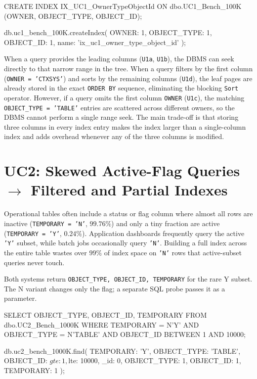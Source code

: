\begin{SQLCode}
CREATE INDEX IX_UC1_OwnerTypeObjectId
ON dbo.UC1_Bench_100K (OWNER, OBJECT_TYPE, OBJECT_ID);
\end{SQLCode}
\begin{MongoCode}
db.uc1_bench_100K.createIndex(
  {OWNER: 1, OBJECT_TYPE: 1, OBJECT_ID: 1},
  {name: 'ix_uc1_owner_type_object_id'}
);
\end{MongoCode}

When a query provides the leading columns (\texttt{U1a}, \texttt{U1b}), the DBMS can seek directly to that narrow range in the tree. When a query filters by the first column (\texttt{OWNER = 'CTXSYS'}) and sorts by the remaining columns (\texttt{U1d}), the leaf pages are already stored in the exact \texttt{ORDER BY} sequence, eliminating the blocking \texttt{Sort} operator. However, if a query omits the first column \texttt{OWNER} (\texttt{U1c}), the matching \texttt{OBJECT\_TYPE = 'TABLE'} entries are scattered across different owners, so the DBMS cannot perform a single range seek. 
The main trade-off is that storing three columns in every index entry makes the index larger than a single-column index and adds overhead whenever any of the three columns is modified.

\UCOneDiagram

\section{UC2: Skewed Active-Flag Queries \texorpdfstring{$\rightarrow$}{->} Filtered and Partial Indexes}

Operational tables often include a status or flag column where almost all rows are inactive (\texttt{TEMPORARY = 'N'}, $99.76\%$) and only a tiny fraction are active (\texttt{TEMPORARY = 'Y'}, $0.24\%$). Application dashboards frequently query the active \texttt{'Y'} subset, while batch jobs occasionally query \texttt{'N'}. Building a full index across the entire table wastes over $99\%$ of index space on \texttt{'N'} rows that active-subset queries never touch.

Both systems return \texttt{OBJECT\_TYPE, OBJECT\_ID, TEMPORARY} for the rare Y subset. The N variant changes only the flag; a separate SQL probe passes it as a parameter.
\begin{SQLCode}
SELECT OBJECT_TYPE, OBJECT_ID, TEMPORARY
FROM dbo.UC2_Bench_1000K
WHERE TEMPORARY = N'Y' AND OBJECT_TYPE = N'TABLE'
  AND OBJECT_ID BETWEEN 1 AND 10000;
\end{SQLCode}
\begin{MongoCode}
db.uc2_bench_1000K.find(
  {TEMPORARY: 'Y', OBJECT_TYPE: 'TABLE',
   OBJECT_ID: {$gte: 1, $lte: 10000}},
  {_id: 0, OBJECT_TYPE: 1, OBJECT_ID: 1, TEMPORARY: 1}
);
\end{MongoCode}

